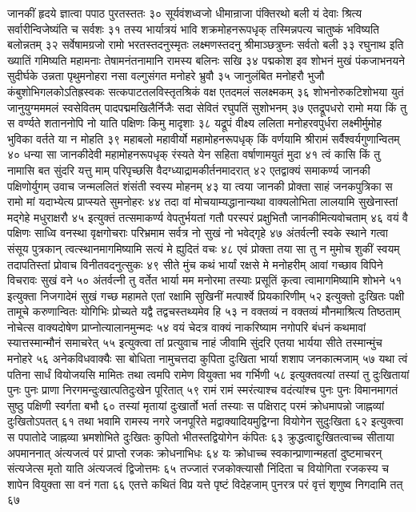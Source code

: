 जानकीं हृदये ज्ञात्वा पपाठ पुरतस्ततः ३०
सूर्यवंशध्वजो धीमान्राजा पंक्तिरथो बली
यं देवाः श्रित्य सर्वारीन्विजेष्यंति च सर्वशः ३१
तस्य भार्यात्रयं भावि शक्रमोहनरूपधृक्
तस्मिन्नपत्य चातुष्कं भविष्यति बलोन्नतम् ३२
सर्वेषामग्रजो रामो भरतस्तदनुस्मृतः
लक्ष्मणस्तदनु श्रीमाञ्छत्रुघ्नः सर्वतो बली ३३
रघुनाथ इति ख्यातिं गमिष्यति महामनाः
तेषामनंतनामानि रामस्य बलिनः सखि ३४
पद्मकोश इव शोभनं मुखं
पंकजाभनयने सुदीर्घके
उन्नता पृथुमनोहरा नसा
वल्गुसंगत मनोहरे भ्रुवौ ३५
जानुलंबित मनोहरौ भुजौ
कंबुशोभिगलकोऽतिह्रस्वकः
सत्कपाटतलविस्तृतश्रिकं
वक्ष एतदमलं सलक्ष्मकम् ३६
शोभनोरुकटिशोभया युतं
जानुयुग्मममलं स्वसेवितम्
पादपद्ममखिलैर्निजैः सदा
सेवितं रघुपतिं सुशोभनम् ३७
एतद्रूपधरो रामो मया किं तु स वर्ण्यते
शताननोपि नो याति पक्षिणः किमु मादृशाः ३८
यद्रूपं वीक्ष्य ललिता मनोहरवपुर्धरा
लक्ष्मीर्मुमोह भुविका वर्तते या न मोहति ३९
महाबलो महावीर्यो महामोहनरूपधृक्
किं वर्णयामि श्रीरामं सर्वैश्वर्यगुणान्वितम् ४०
धन्या सा जानकीदेवी महामोहनरूपधृक्
रंस्यते येन सहिता वर्षाणामयुतं मुदा ४१
त्वं कासि किं तु नामासि बत सुंदरि यत्तु माम्
परिपृच्छसि वैदग्ध्याद्रामकीर्तनमादरात् ४२
एतद्वाक्यं समाकर्ण्य जानकी पक्षिणोर्युगम्
उवाच जन्मललितं शंसंती स्वस्य मोहनम् ४३
या त्वया जानकी प्रोक्ता साहं जनकपुत्रिका
स रामो मां यदाभ्येत्य प्राप्स्यते सुमनोहरः ४४
तदा वां मोचयाम्यद्धानान्यथा वाक्यलोभिता
लालयामि सुखेनास्तां मद्गेहे मधुराक्षरौ ४५
इत्युक्तं तत्समाकर्ण्य वेपतुर्भयतां गतौ
परस्परं प्रक्षुभितौ जानकीमित्यवोचताम् ४६
वयं वै पक्षिणः साध्वि वनस्था वृक्षगोचराः
परिभ्रमाम सर्वत्र नो सुखं नो भवेद्गृहे ४७
अंतर्वत्नी स्वके स्थाने गत्वा संसूय पुत्रकान्
त्वत्स्थानमागमिष्यामि सत्यं मे ह्युदितं वचः ४८
एवं प्रोक्ता तया सा तु न मुमोच शुकीं स्वयम्
तदापतिस्तां प्रोवाच विनीतवदनुत्सुकः ४९
सीते मुंच कथं भार्यां रक्षसे मे मनोहरीम्
आवां गच्छाव विपिने विचरावः सुखं वने ५०
अंतर्वत्नी तु वर्तेत भार्या मम मनोरमा
तस्याः प्रसूतिं कृत्वा त्वामागमिष्यामि शोभने ५१
इत्युक्ता निजगादेमं सुखं गच्छ महामते
एतां रक्षामि सुखिनीं मत्पार्श्वे प्रियकारिणीम् ५२
इत्युक्तो दुःखितः पक्षी तामूचे करुणान्वितः
योगिभिः प्रोच्यते यद्वै तद्वचस्तथ्यमेव हि ५३
न वक्तव्यं न वक्तव्यं मौनमाश्रित्य तिष्ठताम्
नोचेत्स वाक्यदोषेण प्राप्नोत्यालानमुन्मदः ५४
वयं चेदत्र वाक्यं नाकरिष्याम नगोपरि
बंधनं कथमावां स्यात्तस्मान्मौनं समाचरेत् ५५
इत्युक्त्वा तां प्रत्युवाच नाहं जीवामि सुंदरि
एतया भार्यया सीते तस्मान्मुंच मनोहरे ५६
अनेकविधवाक्यैः सा बोधिता नामुचत्तदा
कुपिता दुःखिता भार्या शशाप जनकात्मजाम् ५७
यथा त्वं पतिना सार्धं वियोजयसि मामितः
तथा त्वमपि रामेण वियुक्ता भव गर्भिणी ५८
इत्युक्तवत्यां तस्यां तु दुःखितायां पुनः पुनः
प्राणा निरगमन्दुःखात्पतिदुःखेन पूरितात् ५९
रामं रामं स्मरंत्याश्च वदंत्यांश्च पुनः पुनः
विमानमागतं सुष्ठु पक्षिणी स्वर्गता बभौ ६०
तस्यां मृतायां दुःखार्तो भर्ता तस्याः स पक्षिराट्
परमं क्रोधमापन्नो जाह्नव्यां दुःखितोऽपतत् ६१
तथा भवामि रामस्य नगरे जनपूरिते
मद्वाक्यादियमुद्विग्ना वियोगेन सुदुःखिता ६२
इत्युक्त्वा स पपातोदे जाह्नव्या भ्रमशोभिते
दुःखितः कुपितो भीतस्तद्वियोगेन कंपितः ६३
क्रुद्धत्वाद्दुःखितत्वाच्च सीताया अपमाननात्
अंत्यजत्वं परं प्राप्तो रजकः क्रोधनाभिधः ६४
यः क्रोधाच्च स्वकान्प्राणान्महतां दुष्टमाचरन्
संत्यजेत्स मृतो याति अंत्यजत्वं द्विजोत्तमः ६५
तज्जातं रजकोक्त्यासौ निंदिता च वियोगिता
रजकस्य च शापेन वियुक्ता सा वनं गता ६६
एतत्ते कथितं विप्र यत्ते पृष्टं विदेहजाम्
पुनरत्र परं वृत्तं शृणुष्व निगदामि तत् ६७

